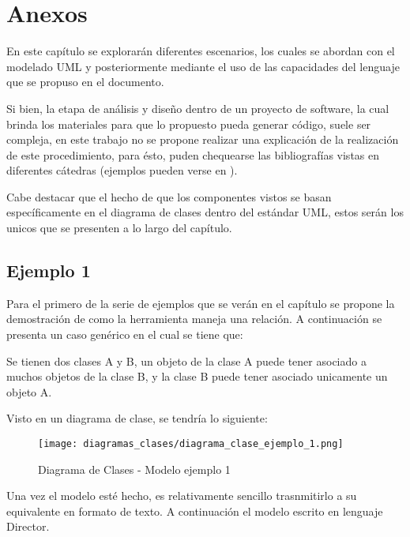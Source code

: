 \chapter{Anexos}
En este capítulo se explorarán diferentes escenarios, los cuales se
abordan con el modelado UML y posteriormente mediante el uso de las
capacidades del lenguaje que se propuso en el documento.

Si bien, la etapa de análisis y diseño dentro de un proyecto de software, la
cual brinda los materiales para que lo propuesto pueda generar código, suele
ser compleja, en este trabajo no se propone realizar una explicación de la
realización de este procedimiento, para ésto, puden chequearse las
bibliografías vistas en diferentes cátedras
(ejemplos pueden verse en \cites{larman2004}{dennis2012}{dathan2015}{satzinger2012}{larman2003}).

Cabe destacar que el hecho de que los componentes vistos se basan
específicamente en el diagrama de clases dentro del estándar UML, estos serán
los unicos que se presenten a lo largo del capítulo.

\section{Ejemplo 1}
\label{sec:ej1}
Para el primero de la serie de ejemplos que se verán en el capítulo se
propone la demostración de como la herramienta maneja una relación. A
continuación se presenta un caso genérico en el cual se tiene que:

\begin{displayquote}
	Se tienen dos clases A y B, un objeto de la clase A puede tener asociado a
	muchos objetos de la clase B, y la clase B puede tener asociado unicamente un
	objeto A.
\end{displayquote}

Visto en un diagrama de clase, se tendría lo siguiente:

\begin{figure}[H]
	\centering
	\texttt{[image: diagramas\_clases/diagrama\_clase\_ejemplo\_1.png]}
	\caption{Diagrama de Clases - Modelo ejemplo 1}
	\label{fig:dc_mod_ej_1}
\end{figure}

Una vez el modelo esté hecho, es relativamente sencillo trasnmitirlo a su
equivalente en formato de texto. A continuación el modelo escrito en lenguaje
Director.



